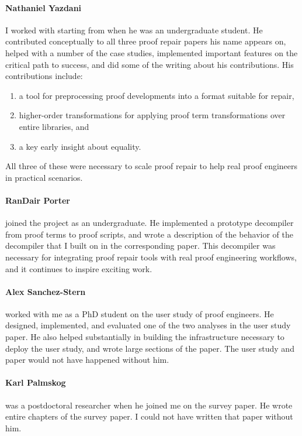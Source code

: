 \paragraph{Nathaniel Yazdani}
I worked with  starting from when he was an undergraduate student.
He contributed conceptually to all three proof repair papers his name appears on,
helped with a number of the case studies,
implemented important features on the critical path to success,
and did some of the writing about his contributions.
His contributions include:

\begin{enumerate}
\item a tool for preprocessing proof developments into a format suitable for repair,
\item higher-order transformations for applying proof term transformations over entire libraries, and
\item a key early insight about equality.
\end{enumerate}
All three of these were necessary to scale proof repair to help real proof engineers in practical scenarios.

\paragraph{RanDair Porter}
 joined the project as an undergraduate.
He implemented a prototype decompiler from proof terms to proof scripts,
and wrote a description of the behavior of the decompiler that I built on in the corresponding paper.
This decompiler was necessary for integrating proof repair tools with real proof engineering workflows,
and it continues to inspire exciting work.

\paragraph{Alex Sanchez-Stern}
 worked with me as a PhD student on the  user study of proof engineers. %
He designed, implemented, and evaluated one of the two analyses in the user study paper.
He also helped substantially in building the infrastructure necessary to deploy the user study,
and wrote large sections of the paper.
The user study and paper would not have happened without him.

\paragraph{Karl Palmskog}
 was a postdoctoral researcher when he joined me on the  survey paper.
He wrote entire chapters of the survey paper.
I could not have written that paper without him.

